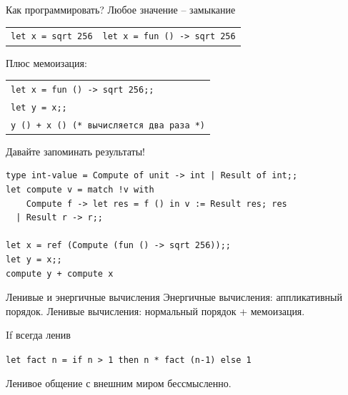 \documentclass[aspectratio=169]{beamer}
\begin{document}
\begin{frame}[fragile]{Как программировать? Любое значение -- замыкание}

\begin{center}\begin{tabular}{ll}
\texttt{let x = sqrt 256} &     \texttt{let x = fun () -> sqrt 256}
\end{tabular}\end{center}

Плюс мемоизация: 

\begin{center}\begin{tabular}{l}
\texttt{let x = fun () -> sqrt 256;;}\\
\texttt{let y = x;;}\\
\texttt{y () + x ()      (* вычисляется два раза *)}
\end{tabular}\end{center}

Давайте запоминать результаты!
\begin{verbatim}
type int-value = Compute of unit -> int | Result of int;;
let compute v = match !v with
    Compute f -> let res = f () in v := Result res; res
  | Result r -> r;;

let x = ref (Compute (fun () -> sqrt 256));;
let y = x;;
compute y + compute x
\end{verbatim}
\end{frame}

\begin{frame}{Ленивые и энергичные вычисления}
Энергичные вычисления: аппликативный порядок.
Ленивые вычисления: нормальный порядок + мемоизация.

If всегда ленив

\begin{center}
\texttt{let fact n = if n > 1 then n * fact (n-1) else 1}
\end{center}

Ленивое общение с внешним миром бессмысленно.
\end{frame}
\end{document}
